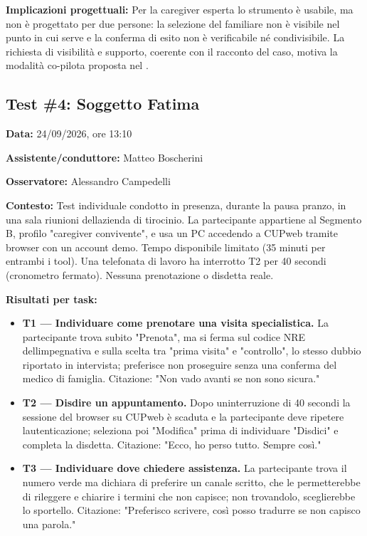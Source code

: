 \textbf{Implicazioni progettuali:} Per la caregiver esperta lo
strumento è usabile, ma non è progettato per due persone: la
selezione del familiare non è visibile nel punto in cui serve
e la conferma di esito non è verificabile né
condivisibile. La richiesta di visibilità e supporto,
coerente con il racconto del caso, motiva la modalità co-pilota proposta
nel .

\subsection{Test \#4: Soggetto Fatima}

\textbf{Data:} 24/09/2026, ore 13:10

\textbf{Assistente/conduttore:} Matteo Boscherini

\textbf{Osservatore:} Alessandro Campedelli

\textbf{Contesto:} Test individuale condotto in presenza, durante la
pausa pranzo, in una sala riunioni dell\textquotesingle azienda di
tirocinio. La partecipante appartiene al Segmento B, profilo
"caregiver convivente", e usa un PC accedendo
a CUPweb tramite browser con un account demo.
Tempo disponibile limitato (35 minuti per entrambi i tool). Una
telefonata di lavoro ha interrotto T2 per 40 secondi (cronometro
fermato). Nessuna prenotazione o disdetta reale.

\textbf{Risultati per task:}

\begin{itemize}
\item
  \textbf{T1 --- Individuare come prenotare una visita specialistica.}
  La partecipante trova
  subito "Prenota", ma si ferma sul codice NRE dell\textquotesingle impegnativa
  e sulla scelta tra "prima visita" e "controllo", lo stesso dubbio
  riportato in intervista; preferisce non proseguire senza una
  conferma del medico di famiglia. Citazione: "Non vado avanti se non
  sono sicura."
\item
  \textbf{T2 --- Disdire un appuntamento.} Dopo un\textquotesingle interruzione
  di 40 secondi la sessione del browser su CUPweb è scaduta e la
  partecipante deve ripetere l\textquotesingle autenticazione; seleziona poi
  "Modifica" prima di individuare "Disdici" e completa la disdetta.
  Citazione: "Ecco, ho perso tutto. Sempre così."
\item
  \textbf{T3 --- Individuare dove chiedere assistenza.} La partecipante trova il numero
  verde ma dichiara di preferire un canale scritto, che le
  permetterebbe di rileggere e chiarire i termini che non capisce; non trovandolo,
  sceglierebbe lo sportello. Citazione: "Preferisco scrivere, così
  posso tradurre se non capisco una parola."
\end{itemize}

